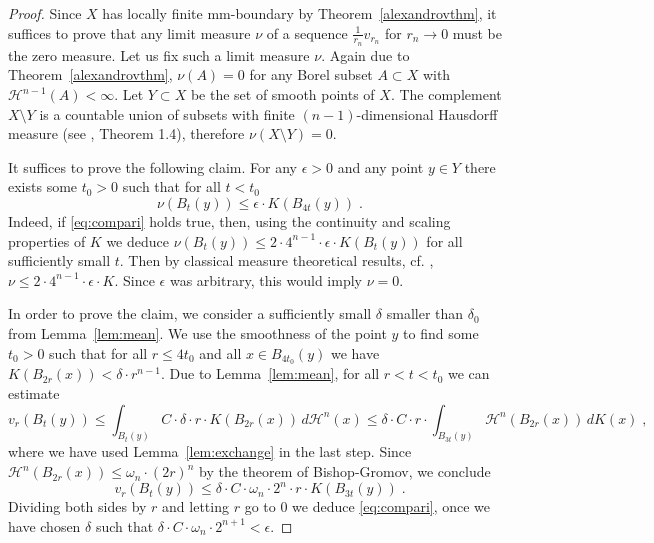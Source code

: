 \documentclass[12pt,leqno]{amsart}
\numberwithin{equation}{section}
\theoremstyle{definition}
\theoremstyle{remark}
\newcommand{\tref}[1]{Theorem~\ref{#1}}
\newcommand{\lref}[1]{Lemma~\ref{#1}}
\begin{document}
\begin{proof}
 Since $X$ has locally finite mm-boundary by
\tref{alexandrovthm}, it suffices to prove that  any limit measure $\nu$ of a sequence $\frac 1 {r_n} v_{r_n}$ for $r_n\to 0$ must be the zero measure.
Let us fix such a limit measure $\nu$.  Again due to \tref{alexandrovthm}, $\nu (A)=0$ for any Borel subset $A\subset X$ with $\mathcal H^{n-1} (A)<\infty$.
Let $Y\subset X$ be the set of smooth points of $X$.
The complement $X\setminus Y$ is a countable union of subsets with finite $(n-1)$-dimensional Hausdorff measure (see \cite{Schneider}, Theorem 1.4), therefore $\nu (X\setminus Y) =0$.


It suffices to prove the following claim. For any $\epsilon   >0$ and  any point $y\in Y$ there exists some $t_0>0$ such that
for all $t<t_0$
\begin{equation} \label{eq:compari}
 \nu (B_t (y)) \leq \epsilon \cdot K (B_{4t}(y)) \; .
\end{equation}
Indeed, if \eqref{eq:compari} holds true, then, using the continuity and scaling properties of $K$ we deduce
$\nu (B_t(y)) \leq 2\cdot 4^{n-1} \cdot \epsilon \cdot K (B_t (y))$ for all sufficiently small $t$. Then by classical measure theoretical results, cf. \cite{Federer}, $\nu \leq 2\cdot 4^{n-1} \cdot  \epsilon  \cdot K$. Since $\epsilon$ was arbitrary, this would imply $\nu  =0$.

In order to prove the claim, we consider a sufficiently small $\delta$ smaller than  $ \delta _0$ from \lref{lem:mean}. We use the smoothness of the point $y$
to find some $t_0>0$ such that  for all $r \leq 4t_0$ and all
 $x\in B_{4t_0} (y)$ we have
$K(B_{2r} (x)) < \delta \cdot r^{n-1}$.    Due to  \lref{lem:mean}, for all $r<t<t_0$ we can estimate
$$v_r (B_t (y)) \leq \int _{B_t(y)} C \cdot  \delta \cdot r\cdot  K(B_{2r} (x))\, d\mathcal H^n (x) \leq \delta \cdot C \cdot r\cdot \int _{B_{3t} (y)}
\mathcal  H^n (B_{2r} (x)) \, dK (x) \; ,$$
where we have used \lref{lem:exchange} in the last step.
Since $\mathcal  H^n (B_{2r} (x)) \leq \omega _n \cdot (2r)^n$ by the theorem of Bishop-Gromov, we conclude
$$ v_r (B_t (y)) \leq  \delta \cdot C \cdot \omega _n \cdot  2^n \cdot r \cdot K (B_{3t} (y)) \; .$$
Dividing both sides by $r$ and letting $r$ go to $0$ we deduce \eqref{eq:compari}, once we have chosen $\delta$ such that
$\delta \cdot C\cdot \omega_n \cdot 2^{n+1} < \epsilon $.
\end{proof}
\end{document}
